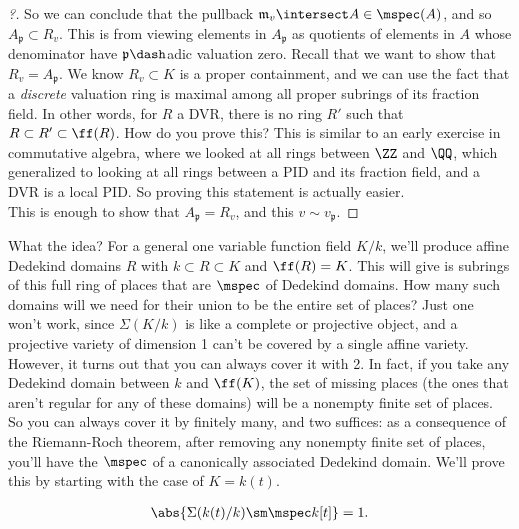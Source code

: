 \begin{proof}[?]
So we can conclude that the pullback
\(\mathfrak{m}_v \intersect A \in \mspec(A)\), and so
\(A_{\mathfrak{p}} \subset R_v\). This is from viewing elements in
\(A_{\mathfrak{p}}\) as quotients of elements in \(A\) whose denominator
have \(\mathfrak{p}\dash\)adic valuation zero. Recall that we want to
show that \(R_v = A_{\mathfrak{p}}\). We know \(R_v \subset K\) is a
proper containment, and we can use the fact that a \emph{discrete}
valuation ring is maximal among all proper subrings of its fraction
field. In other words, for \(R\) a DVR, there is no ring \(R'\) such
that \(R \subset R' \subset \ff(R)\). How do you prove this? This is
similar to an early exercise in commutative algebra, where we looked at
all rings between \(\ZZ\) and \(\QQ\), which generalized to looking at
all rings between a PID and its fraction field, and a DVR is a local
PID. So proving this statement is actually easier.\\

This is enough to show that \(A_{\mathfrak{p}} = R_v\), and this
\(v\sim v_{\mathfrak{p}}\).

\end{proof}

\begin{remark}

What the idea? For a general one variable function field \(K/k\), we'll
produce affine Dedekind domains \(R\) with \(k \subset R \subset K\) and
\(\ff(R) = K\). This will give is subrings of this full ring of places
that are \(\mspec\) of Dedekind domains. How many such domains will we
need for their union to be the entire set of places? Just one won't
work, since \(\Sigma(K/k)\) is like a complete or projective object, and
a projective variety of dimension 1 can't be covered by a single affine
variety. However, it turns out that you can always cover it with 2. In
fact, if you take any Dedekind domain between \(k\) and \(\ff(K)\), the
set of missing places (the ones that aren't regular for any of these
domains) will be a nonempty finite set of places. So you can always
cover it by finitely many, and two suffices: as a consequence of the
Riemann-Roch theorem, after removing any nonempty finite set of places,
you'll have the \(\mspec\) of a canonically associated Dedekind domain.
We'll prove this by starting with the case of \(K = k(t)\).

\end{remark}

\begin{claim}

\begin{align*}  
\abs{ \Sigma(k(t)/k) \sm \mspec k[t] } = 1
.\end{align*}

\end{claim}

